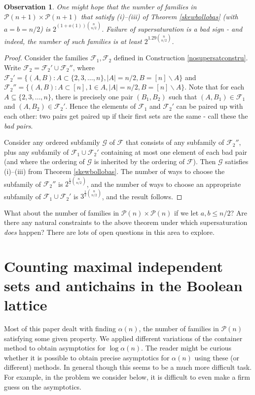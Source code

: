 \documentclass[11pt]{article}
\newtheorem{observation}[theorem]{Observation}
\numberwithin{equation}{section}
\def\P{\mathcal{P}}
\begin{document}
\begin{observation}
One might hope that the number of families in $\mathcal{P}(n+1)\times \mathcal{P}(n+1)$ that satisfy (i)--(iii) of Theorem \ref{skewbollobas} (with $a=b=n/2$)  is $2^{(1+o(1))\binom{n}{n/2}}$. Failure of supersaturation is a bad sign - and indeed, the number of such families is at least $2^{1.29\binom{n}{n/2}}$.
\end{observation}
\begin{proof}
Consider the families $\mathcal{F}_1,\mathcal{F}_2$ defined in Construction \ref{nosupersatconstru}. Write $\mathcal{F}_2=\mathcal{F}_2'\cup \mathcal{F}_2''$, where $\mathcal{F}_2'=\{(A,B): A\subset \{2,3,\ldots,n\}, |A|=n/2, B=[n]\backslash A\}$ and  $\mathcal{F}_2''=\{(A,B): A\subset [n], 1\in A, |A|=n/2, B=[n]\backslash A\}$. Note that for each $A\subseteq\{2,3,\ldots,n\}$, there is precisely one pair $(B_1,B_2)$ such that $(A,B_1)\in \mathcal{F}_1$ and $(A,B_2)\in\mathcal{F}_2'$. Hence the elements of $\mathcal{F}_1$ and $\mathcal{F}_2'$ can be paired up with each other: two pairs get paired up if their first sets are the same - call these the \emph{bad pairs}.

Consider any ordered  subfamily $\mathcal{G}$ of $\mathcal F$ 
 that consists of any subfamily of $\mathcal{F}_2''$, plus any subfamily of $\mathcal{F}_1\cup \mathcal{F}_2'$ containing at most one element of each bad pair (and where the  ordering of $\mathcal G$ is inherited by the ordering of $\mathcal F$).
Then $\mathcal G$
satisfies (i)--(iii) from Theorem \ref{skewbollobas}. The number of ways to choose the subfamily of $\mathcal{F}_2''$ is $2^{\frac{1}{2}\binom{n}{n/2}}$, and the number of ways to choose an appropriate subfamily of $\mathcal{F}_1\cup \mathcal{F}_2'$ is $3^{\frac{1}{2}\binom{n}{n/2}}$, and the result follows.
\end{proof}
What about the number of families in $\mathcal{P}(n)\times \mathcal{P}(n)$ if we let $a,b\leq n/2$?  Are there any natural constraints to the above theorem under which supersaturation \emph{does} happen? There are lots of open questions in this area to explore.







\section{Counting maximal independent sets and antichains in the Boolean lattice}\label{newestsec}
Most of this paper dealt with finding $\alpha(n)$, the number of families in $\P(n)$ satisfying some given property. We applied different variations of the container method to obtain asymptotics for $\log \alpha(n)$. The reader might be curious whether it is possible to obtain precise asymptotics for $\alpha(n)$ using these (or different) methods. In general though this seems to be a much more difficult task. 
For example, in the problem we consider below, it is difficult to even make a firm guess on the asymptotics.  
\end{document}
